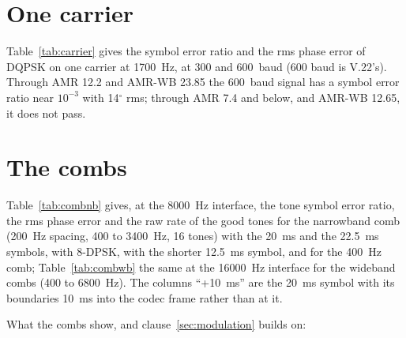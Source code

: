\section{One carrier}
Table~\ref{tab:carrier} gives the symbol error ratio and the rms phase
error of DQPSK on one carrier at 1700~Hz, at 300 and 600~baud (600 baud
is V.22's).  Through AMR 12.2 and AMR-WB 23.85 the 600~baud signal has a
symbol error ratio near $10^{-3}$ with 14$^\circ$ rms; through AMR 7.4
and below, and AMR-WB 12.65, it does not pass.
\begin{table}[htbp]
\caption{DQPSK on one carrier at 1700~Hz: symbol error ratio / rms phase error}
\label{tab:carrier}
\centering\small
\tabcarrier
\end{table}

\section{The combs}\label{sec:combmeas}
Table~\ref{tab:combnb} gives, at the 8000~Hz interface, the tone symbol
error ratio, the rms phase error and the raw rate of the good tones for
the narrowband comb (200~Hz spacing, 400 to 3400~Hz, 16 tones) with the
20~ms and the 22.5~ms symbols, with 8-DPSK, with the shorter 12.5~ms
symbol, and for the 400~Hz comb; Table~\ref{tab:combwb} the same at the
16000~Hz interface for the wideband combs (400 to 6800~Hz).  The columns
``+10~ms'' are the 20~ms symbol with its boundaries 10~ms into the codec
frame rather than at it.
\begin{table}[htbp]
\caption{Combs at the 8000~Hz interface: tone SER / rms phase error / raw rate of the good tones (bit/s)}
\label{tab:combnb}
\centering\scriptsize
\resizebox{\textwidth}{!}{\tabcombnb}
\end{table}
\begin{table}[htbp]
\caption{Combs at the 16000~Hz interface (AMR-WB): tone SER / rms phase error / raw rate of the good tones (bit/s)}
\label{tab:combwb}
\centering\scriptsize
\resizebox{\textwidth}{!}{\tabcombwb}
\end{table}
What the combs show, and clause~\ref{sec:modulation} builds on:
